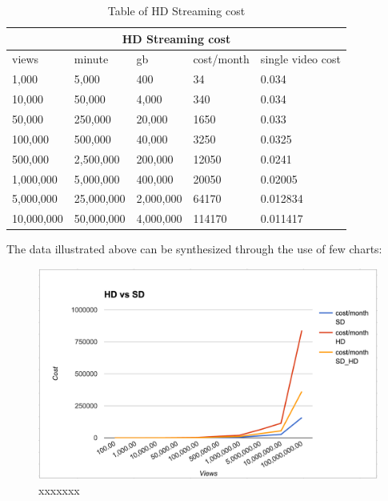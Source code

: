 \begin{table}
\centering 
\begin{tabular}{ |p{2cm}|p{2cm}|p{2cm}|p{2cm}|p{2cm}| }
  \hline
  \multicolumn{5}{|c|}{HD Streaming cost} \\
  \hline
  views & minute & gb & cost/month & single video cost\\
  \hline
1,000 & 5,000 & 400 & 34 & 0.034 \\
10,000 & 50,000 & 4,000 & 340 & 0.034\\
50,000 & 250,000 & 20,000 & 1650 & 0.033\\
100,000 & 500,000 & 40,000 & 3250 & 0.0325\\
500,000 & 2,500,000 & 200,000 & 12050 & 0.0241\\
1,000,000 & 5,000,000 & 400,000 & 20050 & 0.02005\\
5,000,000 & 25,000,000 & 2,000,000 & 64170 & 0.012834\\
10,000,000 & 50,000,000 & 4,000,000 & 114170 & 0.011417\\
  \hline
\end{tabular}
\caption{Table of HD Streaming cost}
\label{table:1}
\end{table}

The data illustrated above can be synthesized through the use of few charts:

\begin{figure}[htb]
 \centering
 \includegraphics[width=1.0\linewidth]{images/chapter2/grafico.png}\hfill
 \caption[xxxxxxx]{xxxxxxx}
 \label{fig:fourV}
\end{figure}
